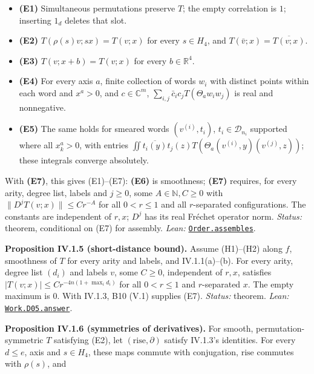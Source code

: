 \documentclass[
  letterpaper,
  11pt]{article}
\providecommand{\tightlist}{%
  \setlength{\itemsep}{0pt}\setlength{\parskip}{0pt}}
\begin{document}
\begin{itemize}
\tightlist
\item
  \textbf{(E1)} Simultaneous permutations preserve \(T\); the empty
  correlation is \(1\); inserting \(1_d\) deletes that slot.
\item
  \textbf{(E2)} \(T(\rho(s)v;sx)=T(v;x)\) for every \(s\in H_4\), and
  \(T(\bar v;x)=\overline{T(v;x)}\).
\item
  \textbf{(E3)} \(T(v;x+b)=T(v;x)\) for every \(b\in\mathbb R^4\).
\item
  \textbf{(E4)} For every axis \(a\), finite collection of words \(w_i\)
  with distinct points within each word and \(x^a>0\), and
  \(c\in\mathbb C^m\), \(\sum_{i,j}\bar c_ic_jT(\Theta_aw_iw_j)\) is
  real and nonnegative.
\item
  \textbf{(E5)} The same holds for smeared words \((v^{(i)},t_i)\),
  \(t_i\in\mathcal D_{n_i}\) supported where all \(x_k^a>0\), with
  entries
  \(\iint\overline{t_i(y)}t_j(z)T(\Theta_a(v^{(i)},y)(v^{(j)},z))\);
  these integrals converge absolutely.
\end{itemize}

With \textbf{(E7)}, this gives (E1)--(E7): \textbf{(E6)} is smoothness;
\textbf{(E7)} requires, for every arity, degree list, labels and
\(j\ge0\), some \(A\in\mathbb N,C\ge0\) with
\(\|D^jT(v;x)\|\le Cr^{-A}\) for all \(0<r\le1\) and all \(r\)-separated
configurations. The constants are independent of \(r,x\); \(D^j\) has
its real Fréchet operator norm. \emph{Status:} theorem, conditional on
(E7) for assembly. \emph{Lean:}
\href{https://github.com/yang-mills-group/OpenAI-YM-20261028/blob/3456e5e75cf8d4cd558955a5c7638fba2d68f464/YM/Extraction/Harvest.lean\#L62-L65}{\texttt{Order.assembles}}.

\textbf{Proposition IV.1.5 (short-distance bound).} Assume (H1)--(H2)
along \(f\), smoothness of \(T\) for every arity and labels, and
IV.1.1(a)--(b). For every arity, degree list \((d_i)\) and labels \(v\),
some \(C\ge0\), independent of \(r,x\), satisfies
\(|T(v;x)|\le Cr^{-4n(1+\max_i d_i)}\) for all \(0<r\le1\) and
\(r\)-separated \(x\). The empty maximum is \(0\). With IV.1.3, B10
(V.1) supplies (E7). \emph{Status:} theorem. \emph{Lean:}
\href{https://github.com/yang-mills-group/OpenAI-YM-20261028/blob/3456e5e75cf8d4cd558955a5c7638fba2d68f464/YM/Work/D05.lean\#L160-L180}{\texttt{Work.D05.answer}}.

\textbf{Proposition IV.1.6 (symmetries of derivatives).} For smooth,
permutation-symmetric \(T\) satisfying (E2), let
\((\mathrm{rise},\partial)\) satisfy IV.1.3's identities. For every
\(d\le e\), axis and \(s\in H_4\), these maps commute with conjugation,
\(\mathrm{rise}\) commutes with \(\rho(s)\), and
\end{document}
